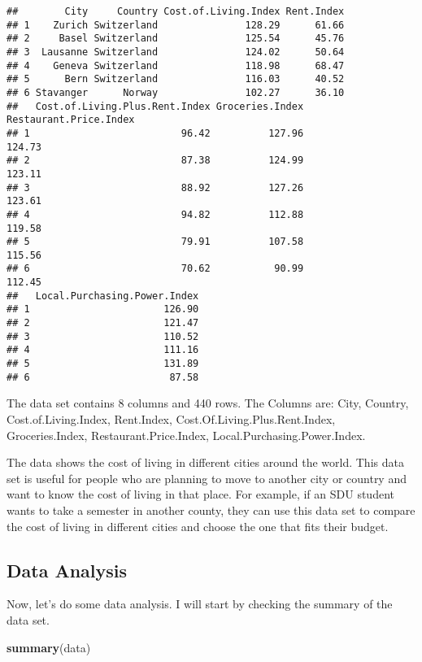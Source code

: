 \documentclass[
]{article}
\newenvironment{Shaded}{\begin{snugshade}}{\end{snugshade}}
\newcommand{\FunctionTok}[1]{\textcolor[rgb]{0.13,0.29,0.53}{\textbf{#1}}}
\newcommand{\NormalTok}[1]{#1}
\begin{document}
\begin{verbatim}
##        City     Country Cost.of.Living.Index Rent.Index
## 1    Zurich Switzerland               128.29      61.66
## 2     Basel Switzerland               125.54      45.76
## 3  Lausanne Switzerland               124.02      50.64
## 4    Geneva Switzerland               118.98      68.47
## 5      Bern Switzerland               116.03      40.52
## 6 Stavanger      Norway               102.27      36.10
##   Cost.of.Living.Plus.Rent.Index Groceries.Index Restaurant.Price.Index
## 1                          96.42          127.96                 124.73
## 2                          87.38          124.99                 123.11
## 3                          88.92          127.26                 123.61
## 4                          94.82          112.88                 119.58
## 5                          79.91          107.58                 115.56
## 6                          70.62           90.99                 112.45
##   Local.Purchasing.Power.Index
## 1                       126.90
## 2                       121.47
## 3                       110.52
## 4                       111.16
## 5                       131.89
## 6                        87.58
\end{verbatim}

The data set contains 8 columns and 440 rows. The Columns are: City,
Country, Cost.of.Living.Index, Rent.Index,
Cost.Of.Living.Plus.Rent.Index, Groceries.Index, Restaurant.Price.Index,
Local.Purchasing.Power.Index.

The data shows the cost of living in different cities around the world.
This data set is useful for people who are planning to move to another
city or country and want to know the cost of living in that place. For
example, if an SDU student wants to take a semester in another county,
they can use this data set to compare the cost of living in different
cities and choose the one that fits their budget.

\subsection{Data Analysis}\label{data-analysis}

Now, let's do some data analysis. I will start by checking the summary
of the data set.

\begin{Shaded}
\begin{Highlighting}[]
\FunctionTok{summary}\NormalTok{(data)}
\end{Highlighting}
\end{Shaded}
\end{document}
